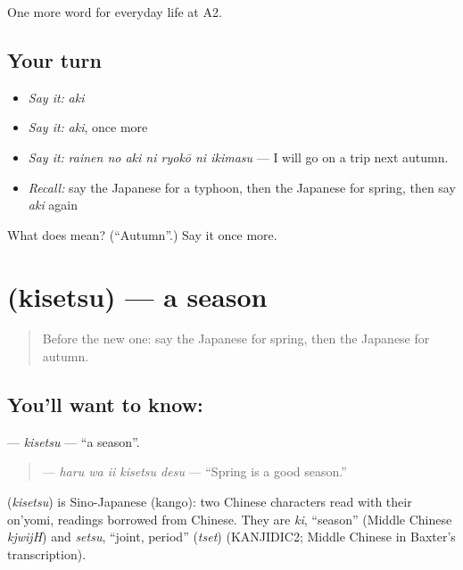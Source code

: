 \begin{grammarlens}[title={What you've built}]
One more word for everyday life at A2.
\end{grammarlens}

\subsection*{Your turn}
\begin{itemize}
\raggedright
  \item \emph{Say it:} \emph{aki}
  \item \emph{Say it:} \emph{aki}, once more
  \item \emph{Say it:} \emph{rainen no aki ni ryokō ni ikimasu} — I will go on a trip next autumn.
  \item \emph{Recall:} say the Japanese for a typhoon, then the Japanese for spring, then say \emph{aki} again
\end{itemize}

\begin{tcolorbox}[breakable,colback=teal!4,colframe=teal!35!black,title={Before you move on}]
What does  mean? (\textquotedblleft{}Autumn\textquotedblright{}.) Say it once more.
\end{tcolorbox}
\section[\texorpdfstring{\ja{きせつ} (kisetsu)}{きせつ (kisetsu)}]{ (kisetsu) — a season}

\label{lesson:JA-C209-kisetsu}



\begin{quote}
Before the new one: say the Japanese for spring, then the Japanese for autumn.
\end{quote}

\subsection*{You'll want to know: }
\textbf{} — \emph{kisetsu} — \textquotedblleft{}a season\textquotedblright{}.

\begin{quote}
\textbf{  } — \emph{haru wa ii kisetsu desu} — \textquotedblleft{}Spring is a good season.\textquotedblright{}
\end{quote}

\begin{cousinweb}
\textbf{} (\emph{kisetsu}) is Sino-Japanese (kango): two Chinese characters read with their on'yomi, readings borrowed from Chinese. They are \emph{ki}, \textquotedblleft{}season\textquotedblright{} (Middle Chinese \emph{kjwijH}) and \emph{setsu}, \textquotedblleft{}joint, period\textquotedblright{} (\emph{tset}) (KANJIDIC2; Middle Chinese in Baxter's transcription).
\end{cousinweb}

